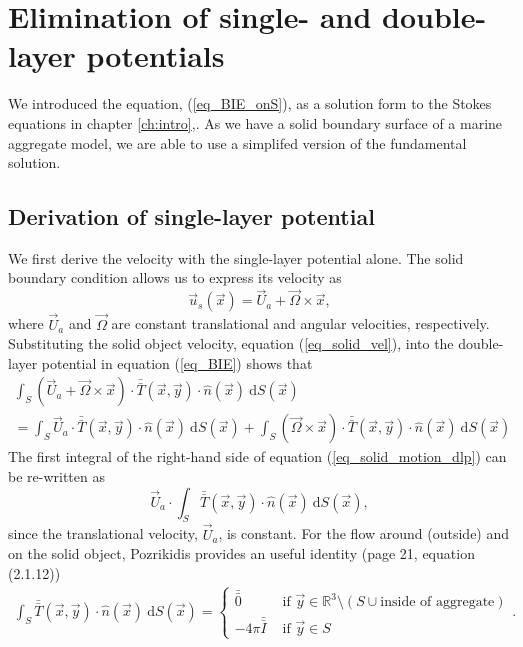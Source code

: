 %
\section{Elimination of single- and double-layer potentials}
We introduced the equation, (\ref{eq_BIE_onS}), as a solution form to the Stokes equations in chapter \ref{ch:intro},. As we have a solid boundary surface of a marine aggregate model, we are able to use a simplifed version of the fundamental solution.
\subsection{Derivation of single-layer potential}
We first derive the velocity with the single-layer potential alone.
The solid boundary condition allows us to express its velocity as 
\begin{equation}
	\vec{u}_s \left( \vec{x} \right) 
	= \vec{U}_a + \vec{\Omega} \times \vec{x}  ,
	\label{eq_solid_vel}
\end{equation}
where $\vec{U}_a$ and $\vec{\Omega}$ are constant translational and angular velocities, respectively. 
Substituting the solid object velocity, equation (\ref{eq_solid_vel}), into the double-layer potential in equation (\ref{eq_BIE}) shows that 
\begin{align}
	\int_S
	\left( \vec{U}_a + \vec{\Omega} \times \vec{x} \right)
	 \cdot  \bar{\bar{T}}(\vec{x},\vec{y})  
	\cdot \hat{n} ( \vec{x})
	\ \text{d}S(\vec{x})
    \nonumber \\
	= 
	\int_S
	\vec{U}_a
	 \cdot  \bar{\bar{T}}(\vec{x},\vec{y})  
	\cdot \hat{n} ( \vec{x})
	\ \text{d}S(\vec{x})
     + 	
	\int_S
	\left(  \vec{\Omega} \times \vec{x} \right)
	 \cdot  \bar{\bar{T}}(\vec{x},\vec{y})  
	\cdot \hat{n} ( \vec{x})
	\ \text{d}S(\vec{x})
	\label{eq_solid_motion_dlp}
\end{align}
The first integral of the right-hand side of equation (\ref{eq_solid_motion_dlp}) can be re-written as 
\begin{equation}
	\vec{U}_a \cdot
	\int_S
	  \bar{\bar{T}}(\vec{x},\vec{y})  
	\cdot \hat{n} ( \vec{x})
	\ \text{d}S(\vec{x}),
	\label{eq_solid_motion_dlp_Ua}
\end{equation}
since the translational velocity, $\vec{U}_a$, is constant. 
For the flow around (outside) and on the solid object, Pozrikidis provides an useful identity \cite{pozrikidis_boundary_1992} (page 21, equation (2.1.12))
\begin{align}
	\int_S  \bar{\bar{T}}(\vec{x},\vec{y}) \cdot \hat{n} ( \vec{x})
	\ \text{d}S(\vec{x})
	=
	 \begin{cases}
	 \bar{\bar{0}} & \text{ if } \vec{y} \in \mathbb{R}^3  \setminus  \left( S \cup {\text{inside of aggregate}}\right) 	\\ 
	 - 4\pi \bar{\bar{I}} & \text{ if } \vec{y} \in S 
	 \end{cases}.
	\label{eq_dlp_identity1}
\end{align}
